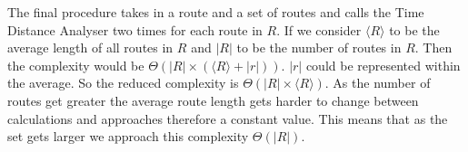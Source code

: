 The final procedure takes in a route and a set of routes and calls the Time Distance Analyser two times for each route in $R$.
If we consider $\langle R \rangle$ to be the average length of all routes in $R$ and $|R|$ to be the number of routes in $R$.
Then the complexity would be $\Theta(|R|\times(\langle R\rangle + |r|))$.
$|r|$ could be represented within the average.
So the reduced complexity is $\Theta(|R|\times\langle R\rangle)$.
As the number of routes get greater the average route length gets harder to change between calculations and approaches therefore a constant value.
This means that as the set gets larger we approach this complexity $\Theta(|R|)$.